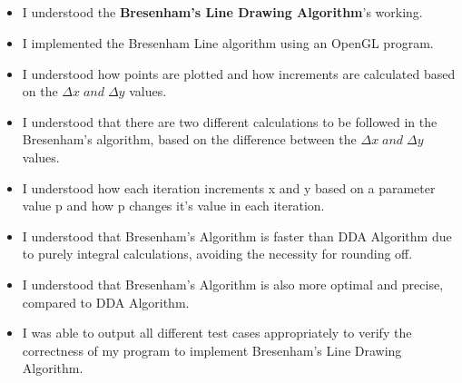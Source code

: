 \documentclass[12pt, a4]{article}
\begin{document}
\newpage
\subsection*{}
\begin{itemize}
\item I understood the \textbf{Bresenham's Line Drawing Algorithm}'s working.
\item I implemented the Bresenham Line algorithm using an OpenGL program.
\item I understood how points are plotted and how increments are calculated based on the $\Delta x \; and \; \Delta y$ values.
\item I understood that there are two different calculations to be followed in the Bresenham's algorithm, based on the difference between the $\Delta x \; and \; \Delta y$ values.
\item I understood how each iteration increments x and y based on a parameter value p and how p changes it's value in each iteration.
\item I understood that Bresenham's Algorithm is faster than DDA Algorithm due to purely integral calculations, avoiding the necessity for rounding off.
\item I understood that Bresenham's Algorithm is also more optimal and precise, compared to DDA Algorithm.
\item I was able to output all different test cases appropriately to verify the correctness of my program to implement Bresenham's Line Drawing Algorithm.

\end{itemize}
\end{document}
